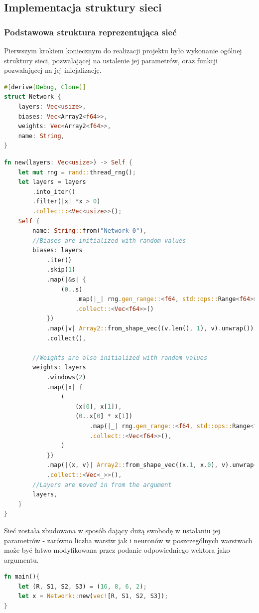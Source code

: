 \documentclass[12pt,twoside]{article}
\begin{document}
\subsection{Implementacja struktury sieci}
\subsubsection{Podstawowa struktura reprezentująca sieć}
Pierwszym krokiem koniecznym do realizacji projektu było wykonanie ogólnej struktury sieci, pozwalającej na ustalenie jej parametrów, oraz funkcji pozwalającej na jej inicjalizację.


\begin{lstlisting}[language=Rust,caption=Podstawowa struktura sieci neuronowej,label={lst:netStructure}]
#[derive(Debug, Clone)]
struct Network {
    layers: Vec<usize>,
    biases: Vec<Array2<f64>>,
    weights: Vec<Array2<f64>>,
    name: String,
}
\end{lstlisting}

\begin{lstlisting}[language=Rust,caption=Konstruktor struktury sieci neuronowej,label={lst:netConstructor}]
fn new(layers: Vec<usize>) -> Self {
	let mut rng = rand::thread_rng();
	let layers = layers
		.into_iter()
		.filter(|x| *x > 0)
		.collect::<Vec<usize>>();
	Self {
		name: String::from("Network 0"),
		//Biases are initialized with random values
		biases: layers
			.iter()
			.skip(1)
			.map(|&s| {
				(0..s)
					.map(|_| rng.gen_range::<f64, std::ops::Range<f64>>(-1.0..1.0))
					.collect::<Vec<f64>>()
			})
			.map(|v| Array2::from_shape_vec((v.len(), 1), v).unwrap())
			.collect(),

		//Weights are also initialized with random values
		weights: layers
			.windows(2)
			.map(|x| {
				(
					(x[0], x[1]),
					(0..x[0] * x[1])
						.map(|_| rng.gen_range::<f64, std::ops::Range<f64>>(-1.0..1.0))
						.collect::<Vec<f64>>(),
				)
			})
			.map(|(x, v)| Array2::from_shape_vec((x.1, x.0), v).unwrap())
			.collect::<Vec<_>>(),
		//Layers are moved in from the argument
		layers,
	}
}

\end{lstlisting}

Sieć została zbudowana w sposób dający dużą swobodę w ustalaniu jej parametrów - zarówno liczba warstw jak i neuronów w poszczególnych warstwach może być łatwo modyfikowana przez podanie odpowiedniego wektora jako argumentu.


\begin{lstlisting}[language=Rust,caption=Utworzenie przykładowej struktury sieci,label={lst:netExample}]
fn main(){
	let (R, S1, S2, S3) = (16, 8, 6, 2);
	let x = Network::new(vec![R, S1, S2, S3]);
}
\end{lstlisting}
\end{document}
